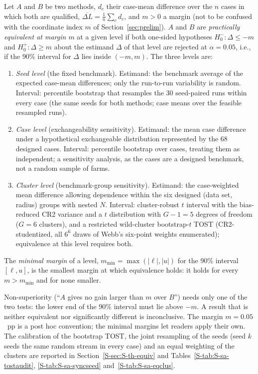\begin{definition}
\label{def:S-equiv}
Let $A$ and $B$ be two methods, $d_c$ their case-mean difference over the $n$ cases in which both are qualified, $\overline{\Delta L}=\frac1n\sum_c d_c$, and $m>0$ a margin (not to be confused with the coordinate index $m$ of Section~\ref{sec:prelim}). $A$ and $B$ are \emph{practically equivalent at margin $m$} at a given level if both one-sided hypotheses $H_0^-\colon\Delta\le-m$ and $H_0^+\colon\Delta\ge m$ about the estimand $\Delta$ of that level are rejected at $\alpha=0.05$, i.e., if the 90\% interval for $\Delta$ lies inside $(-m,m)$. The three levels are:
\begin{enumerate}
\item[(a)] \emph{Seed level} (the fixed benchmark). Estimand: the benchmark average of the expected case-mean differences; only the run-to-run variability is random. Interval: percentile bootstrap that resamples the 30 seed-paired runs within every case (the same seeds for both methods; case means over the feasible resampled runs).
\item[(b)] \emph{Case level} (exchangeability sensitivity). Estimand: the mean case difference under a hypothetical exchangeable distribution represented by the 68 designed cases. Interval: percentile bootstrap over cases, treating them as independent; a sensitivity analysis, as the cases are a designed benchmark, not a random sample of farms.
\item[(c)] \emph{Cluster level} (benchmark-group sensitivity). Estimand: the case-weighted mean difference allowing dependence within the six designed (data set, radius) groups with nested $N$. Interval: cluster-robust $t$ interval with the bias-reduced CR2 variance and a $t$ distribution with $G-1=5$ degrees of freedom ($G=6$ clusters), and a restricted wild-cluster bootstrap-$t$ TOST (CR2-studentized, all $6^6$ draws of Webb's six-point weights enumerated); equivalence at this level requires both.
\end{enumerate}
The \emph{minimal margin} of a level, $m_{\min}=\max(\lvert\ell\rvert,\lvert u\rvert)$ for the 90\% interval $[\ell,u]$, is the smallest margin at which equivalence holds: it holds for every $m>m_{\min}$ and for none smaller.
\end{definition}
Non-superiority (``$A$ gives no gain larger than $m$ over $B$'') needs only one of the two tests: the lower end of the 90\% interval must lie above $-m$. A result that is neither equivalent nor significantly different is inconclusive. The margin $m=0.05$~pp is a post hoc convention; the minimal margins let readers apply their own. The calibration of the bootstrap TOST, the joint resampling of the seeds (seed $k$ seeds the same random stream in every case) and an equal weighting of the clusters are reported in Section~\ref{S-sec:S-th-equiv} and Tables~\ref{S-tab:S-sa-tostaudit}, \ref{S-tab:S-sa-syncseed} and~\ref{S-tab:S-sa-eqclus}.
